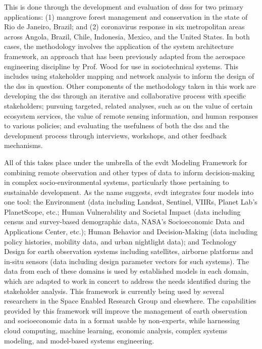 \documentclass[notitlepage]{article}
\begin{document}
This is done through the development and evaluation of \acp{dss} for two primary applications: (1) mangrove forest management and conservation in the state of Rio de Janeiro, Brazil; and (2) coronavirus response in six metropolitan areas across Angola, Brazil, Chile, Indonesia, Mexico, and the United States. In both cases, the methodology involves the application of the system architecture framework, an approach that has been previously adapted from the aerospace engineering discipline by Prof. Wood for use in sociotechnical systems. This includes using stakeholder mapping and network analysis to inform the design of the \ac{dss} in question. Other components of the methodology taken in this work are developing the \ac{dss} through an iterative and collaborative process with specific stakeholders; pursuing targeted, related analyses, such as on the value of certain ecosystem services, the value of remote sensing information, and human responses to various policies; and evaluating the usefulness of both the \ac{dss} and the development process through interviews, workshops, and other feedback mechanisms.

All of this takes place under the umbrella of the \ac{evdt} Modeling Framework for combining remote observation and other types of data to inform decision-making in complex socio-environmental systems, particularly those pertaining to sustainable development. As the name suggests, \ac{evdt} integrates four models into one tool: the Environment (data including Landsat, Sentinel, VIIRs, Planet Lab’s PlanetScope, etc.; Human Vulnerability and Societal Impact (data including census and survey-based demographic data, NASA’s Socioeconomic Data and Applications Center, etc.); Human Behavior and Decision-Making (data including policy histories, mobility data, and urban nightlight data); and Technology Design for earth observation systems including satellites, airborne platforms and in-situ sensors (data including design parameter vectors for such systems). The data from each of these domains is used by established models in each domain, which are adapted to work in concert to address the needs identified during the stakeholder analysis. This framework is currently being used by several researchers in the Space Enabled Research Group and elsewhere. The capabilities provided by this framework will improve the management of earth observation and socioeconomic data in a format usable by non-experts, while harnessing cloud computing, machine learning, economic analysis, complex systems modeling, and model-based systems engineering.
\end{document}
